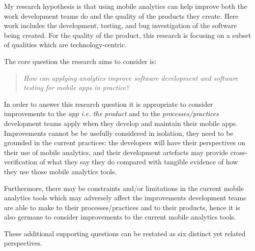 

My research hypothesis is that using mobile analytics can help improve both the work development teams do and the quality of the products they create. Here work includes the development, testing, and bug investigation of the software being created. For the quality of the product, this research is focusing on a subset of qualities which are technology-centric.

The core question the research aims to consider is:
\begin{quote}
  \emph{How can applying analytics improve software development and software testing for mobile apps in practice?}~\label{overall-research-question}
\end{quote}

In order to answer this research question it is appropriate to consider improvements to the \emph{app i.e. the product} and to the \emph{processes/practices} development teams apply when they develop and maintain their mobile apps. Improvements cannot be be usefully considered in isolation, they need to be grounded in the current practices: the developers will have their perspectives on their use of mobile analytics, and their development artefacts may provide cross-verification of what they say they do compared with tangible evidence of how they use those mobile analytics tools. 

Furthermore, there may be constraints and/or limitations in the current mobile analytics tools which may adversely affect the improvements development teams are able to make to their processes/practices and to their products, hence it is also germane to consider improvements to the current mobile analytics tools.

These additional supporting questions can be restated as six distinct yet related perspectives.

